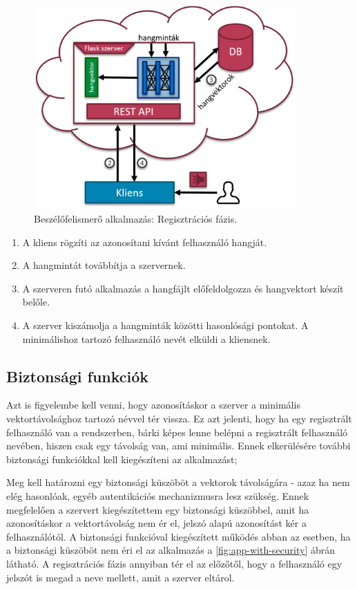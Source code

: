 \begin{figure}[!ht]
	\centering
	\includegraphics[width=100mm, keepaspectratio]{figures/app-identify.png}
	\caption{Beszélőfelismerő alkalmazás: Regisztrációs fázis.}
	\label{fig:app-identify}
\end{figure}

\begin{enumerate}
	\item A kliens rögzíti az azonosítani kívánt felhasználó hangját.
	\item A hangmintát továbbítja a szervernek.
	\item A szerveren futó alkalmazás a hangfájlt előfeldolgozza és hangvektort készít belőle.
	\item A szerver kiszámolja a hangminták közötti hasonlósági pontokat. A minimálishoz tartozó felhasználó nevét elküldi a kliensnek.
\end{enumerate}

\subsection{Biztonsági funkciók}

Azt is figyelembe kell venni, hogy azonosításkor a szerver a minimális vektortávolsághoz tartozó névvel tér vissza. Ez azt jelenti, hogy ha egy regisztrált felhasználó van a rendszerben,
bárki képes lenne belépni a regisztrált felhasználó nevében, hiszen csak egy távolság van, ami minimális. Ennek elkerülésére további biztonsági funkciókkal kell kiegészíteni az alkalmazást;

Meg kell határozni egy biztonsági küszöböt a vektorok távolságára - azaz ha nem elég hasonlóak, egyéb autentikációs mechanizmusra lesz szükség. Ennek megfelelően a szervert
kiegészítettem egy biztonsági küszöbbel, amit ha azonosításkor a vektortávolság nem ér el, jelszó alapú azonosítást kér a felhasználótól. A biztonsági funkcióval kiegészített
működés abban az esetben, ha a biztonsági küszöböt nem éri el az alkalmazás a \ref{fig:app-with-security} ábrán látható. A regisztrációs fázis annyiban tér el az előzőtől, hogy a felhasználó egy jelszót is megad a neve mellett, amit
a szerver eltárol.

